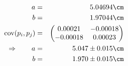 \begin{eqnarray}
    a &=& 5.04694 \cm \nonumber \\
    b &=& 1.97044 \cm \nonumber \\
    \mathrm{cov}(p_i, p_j) &=& 
    \begin{pmatrix}
        0.00021 &-0.00018 \\
        -0.00018 &0.00023 \\
    \end{pmatrix}
\\ \Rightarrow \qquad
    a &=& 5.047 \pm 0.015 \cm\\
    b &=& 1.970 \pm 0.015 \cm
\end{eqnarray}

